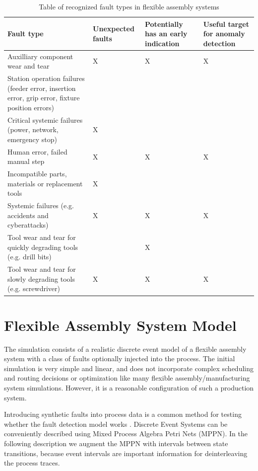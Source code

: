 \documentclass[procedia]{easychair}
\begin{document}
\begin{table}[!t]
\tiny
\renewcommand{\arraystretch}{1.3}
\caption{Table of recognized fault types in flexible assembly systems}
\label{faults}
\centering
\begin{tabular}{|p{50mm}|p{25mm}|p{25mm}|p{25mm}|}
\hline
Fault type & Unexpected faults & Potentially has an early indication & Useful target for anomaly detection \\
\hline
\hline
Auxilliary component wear and tear & X & X & X \\
\hline
Station operation failures (feeder error, insertion error, grip error, fixture position errors) & & & \\
\hline
Critical systemic failures (power, network, emergency stop) & X & & \\
\hline
Human error, failed manual step & X & X & X \\
\hline
Incompatible parts, materials or replacement tools & X & & \\
\hline
Systemic failures (e.g. accidents and cyberattacks) & X & X & X \\
\hline
Tool wear and tear for quickly degrading tools (e.g. drill bits) & & X & \\
\hline
Tool wear and tear for slowly degrading tools (e.g. screwdriver) & X & X & X \\
\hline
\end{tabular}
\end{table}

\section{Flexible Assembly System Model}

The simulation consists of a realistic discrete event model of a flexible assembly system with a class of faults optionally injected into the process.
The initial simulation is very simple and linear, and does not incorporate complex scheduling and routing decisions or optimization like many flexible assembly/manufacturing system simulations\cite{donath1988flexible}.
However, it is a reasonable configuration of such a production system.

Introducing synthetic faults into process data is a common method for testing whether the fault detection model works \cite{able2016model}.
Discrete Event Systems can be conveniently
described using Mixed Process Algebra Petri Nets (MPPN)\cite{falkman2001modeling}. In the following description we augment the MPPN with intervals between state transitions,
because event intervals are important information for deinterleaving the process traces.
\end{document}
